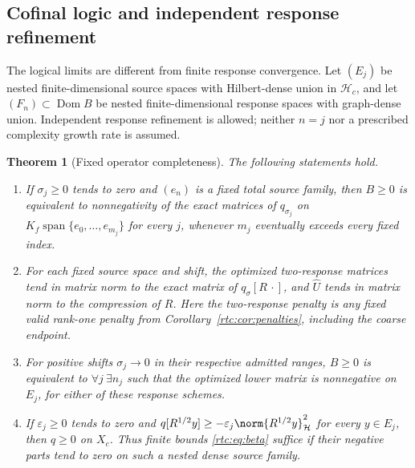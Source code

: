 \documentclass[11pt,a4paper]{article}
\numberwithin{equation}{section}
\newtheorem{theorem}{Theorem}[section]
\theoremstyle{definition}\newtheorem{definition}[theorem]{Definition}
\theoremstyle{remark}\newtheorem{remark}[theorem]{Remark}
\newcommand{\Hh}{\mathcal H}\newcommand{\Hw}{\mathcal H}
\begin{document}
\subsection{Cofinal logic and independent response refinement}\label{rtc:sec:cofinal}
The logical limits are different from finite response convergence.
Let $(E_j)$ be nested finite-dimensional source spaces with Hilbert-dense
union in $\Hh_c$, and let $(F_n)\subset\operatorname{Dom}B$ be nested
finite-dimensional response spaces with graph-dense union.
Independent response refinement is allowed; neither $n=j$ nor a prescribed
complexity growth rate is assumed.

\begin{theorem}[Fixed operator completeness]\label{rtc:thm:cofinal}
The following statements hold.
\begin{enumerate}
\item If $\sigma_j\ge0$ tends to zero and $(e_n)$ is a fixed total source
family, then $B\ge0$ is equivalent to nonnegativity of the exact matrices
of $q_{\sigma_j}$ on $K_f\operatorname{span}\{e_0,\ldots,e_{m_j}\}$
for every $j$, whenever $m_j$ eventually exceeds every fixed index.
\item For each fixed source space and shift, the optimized two-response
matrices tend in matrix norm to the exact matrix of $q_\sigma[R\,\cdot]$,
and $\widehat U$ tends in matrix norm to the compression of $R$.
Here the two-response penalty is any fixed valid rank-one penalty from
Corollary~\ref{rtc:cor:penalties}, including the coarse endpoint.
\item For positive shifts $\sigma_j\to0$ in their respective admitted
ranges, $B\ge0$ is equivalent to
$\forall j\ \exists n_j$ such that the optimized lower matrix is
nonnegative on $E_j$, for either of these response schemes.
\item If $\varepsilon_j\ge0$ tends to zero and
$q[R^{1/2}y]\ge-\varepsilon_j\norm{R^{1/2}y}_{\Hh}^2$ for every
$y\in E_j$, then $q\ge0$ on $X_c$.
Thus finite bounds \eqref{rtc:eq:beta} suffice if their negative parts
tend to zero on such a nested dense source family.
\end{enumerate}
\end{theorem}
\end{document}
